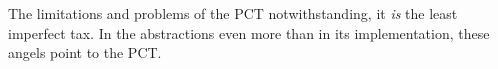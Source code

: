 The limitations and problems of the PCT notwithstanding, it \emph{is} the least imperfect tax. In the abstractions even more than in its implementation, these angels point to the PCT.










